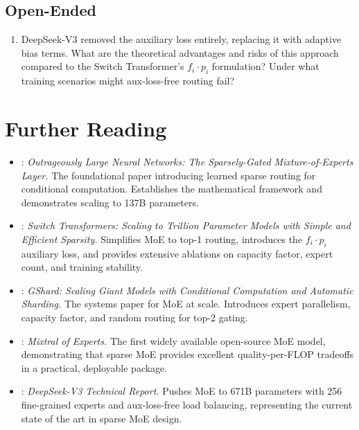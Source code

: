 \subsection*{Open-Ended}
\begin{enumerate}
  \item DeepSeek-V3 removed the auxiliary loss entirely, replacing it with adaptive bias terms. What are the theoretical advantages and risks of this approach compared to the Switch Transformer's $f_i \cdot p_i$ formulation? Under what training scenarios might aux-loss-free routing fail?
\end{enumerate}

\section{Further Reading}
\label{ch:13:sec:further}

\begin{itemize}
  \item \textcite{moe_2017}: \emph{Outrageously Large Neural Networks: The Sparsely-Gated Mixture-of-Experts Layer.} The foundational paper introducing learned sparse routing for conditional computation. Establishes the mathematical framework and demonstrates scaling to 137B parameters.
  \item \textcite{switch_transformers_2021}: \emph{Switch Transformers: Scaling to Trillion Parameter Models with Simple and Efficient Sparsity.} Simplifies MoE to top-1 routing, introduces the $f_i \cdot p_i$ auxiliary loss, and provides extensive ablations on capacity factor, expert count, and training stability.
  \item \textcite{gshard2020}: \emph{GShard: Scaling Giant Models with Conditional Computation and Automatic Sharding.} The systems paper for MoE at scale. Introduces expert parallelism, capacity factor, and random routing for top-2 gating.
  \item \textcite{mixtral}: \emph{Mixtral of Experts.} The first widely available open-source MoE model, demonstrating that sparse MoE provides excellent quality-per-FLOP tradeoffs in a practical, deployable package.
  \item \textcite{deepseek_v3}: \emph{DeepSeek-V3 Technical Report.} Pushes MoE to 671B parameters with 256 fine-grained experts and aux-loss-free load balancing, representing the current state of the art in sparse MoE design.
\end{itemize}

